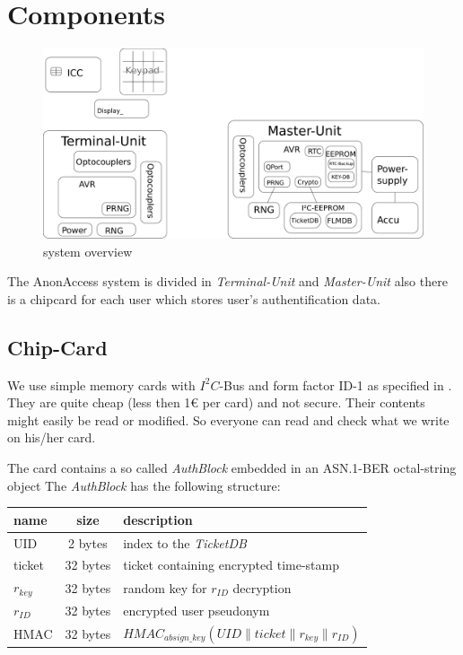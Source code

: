 \section{Components}
\begin{figure}
\includegraphics[scale=0.17]{Overview} 
\caption{system overview}
\end{figure}
The AnonAccess system is divided in \textit{Terminal-Unit} and \textit{Master-Unit} also there is a chipcard for each user which stores user's authentification data.


\subsection{Chip-Card}
We use simple memory cards with $I^2C$-Bus\cite{I2C} and form factor ID-1 as specified in \cite{ISO7816-1}\cite{ISO7816-2}. They are quite cheap (less then 1\euro{} per card) and not secure. Their contents might easily be read or modified. So everyone can read and check what we write on his/her card.

The card contains a so called \textit{AuthBlock} embedded in an ASN.1-BER\cite{ASN.1BER} octal-string object
The \textit{AuthBlock} has the following structure:\\
\begin{tabular}{|l|c|l|} \hline
name & size & description \\ \hline 
UID            & 2 bytes & index to the \textit{TicketDB} \\
ticket         & 32 bytes & ticket containing encrypted time-stamp \\
$r_{key}$ & 32 bytes & random key for $r_{ID}$ decryption \\
$r_{ID}$   & 32 bytes & encrypted user pseudonym \\
HMAC        & 32 bytes & $HMAC_{absign\_key}(UID \parallel ticket \parallel r_{key} \parallel r_{ID})$\\ \hline
\end{tabular} 

